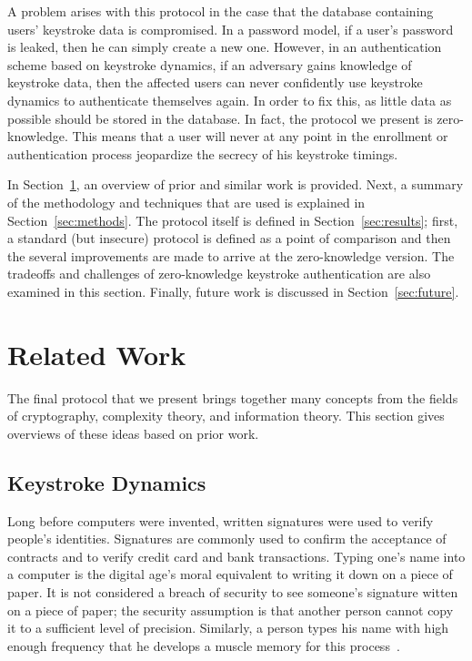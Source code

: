 \documentclass[11pt]{article}
\begin{document}
A problem arises with this protocol in the case that the database containing users' keystroke data is compromised. In a password model, if a user's password is leaked, then he can simply create a new one. However, in an authentication scheme based on keystroke dynamics, if an adversary gains knowledge of keystroke data, then the affected users can never confidently use keystroke dynamics to authenticate themselves again. In order to fix this, as little data as possible should be stored in the database. In fact, the protocol we present is zero-knowledge. This means that a user will never at any point in the enrollment or authentication process jeopardize the secrecy of his keystroke timings.

In Section~\ref{sec:related}, an overview of prior and similar work is provided. Next, a summary of the methodology and techniques that are used is explained in Section~\ref{sec:methods}. The protocol itself is defined in Section~\ref{sec:results}; first, a standard (but insecure) protocol is defined as a point of comparison and then the several improvements are made to arrive at the zero-knowledge version. The tradeoffs and challenges of zero-knowledge keystroke authentication are also examined in this section. Finally, future work is discussed in Section~\ref{sec:future}.

\section{Related Work}
\label{sec:related}
The final protocol that we present brings together many concepts from the fields of cryptography, complexity theory, and information theory. This section gives overviews of these ideas based on prior work.

\subsection{Keystroke Dynamics}
\label{sec:bg-keystroke}
Long before computers were invented, written signatures were used to verify people's identities. Signatures are commonly used to confirm the acceptance of contracts and to verify credit card and bank transactions. Typing one's name into a computer is the digital age's moral equivalent to writing it down on a piece of paper. It is not considered a breach of security to see someone's signature witten on a piece of paper; the security assumption is that another person cannot copy it to a sufficient level of precision. Similarly, a person types his name with high enough frequency that he develops a muscle memory for this process~\cite{monrose:authentication}.
\end{document}
